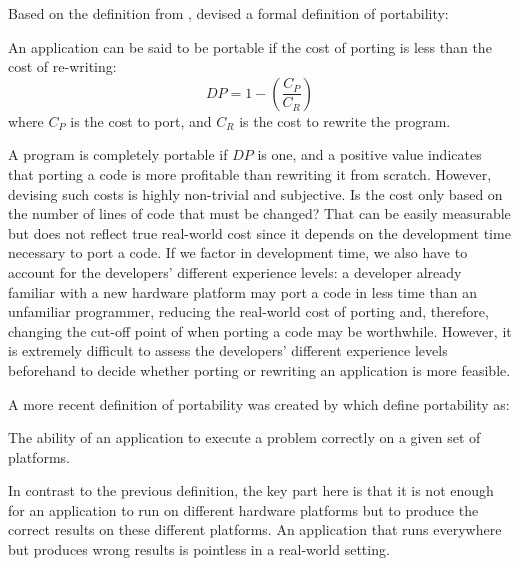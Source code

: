 Based on the definition from \citet{mooney_strategies_1990, mooney_bringing_1997}, \citet{sedova_high-performance_2018} devised a formal definition of portability:
\begin{definition}
An application can be said to be portable if the cost of porting is less than the cost of re-writing:
$$DP = 1 - \left(\frac{C_P}{C_R}\right)$$
where $C_P$ is the cost to port, and $C_R$ is the cost to rewrite the program. 
\end{definition}
A program is completely portable if $DP$ is one, and a positive value indicates that porting a code is more profitable than rewriting it from scratch. 
However, devising such costs is highly non-trivial and subjective. 
Is the cost only based on the number of lines of code that must be changed? 
That can be easily measurable but does not reflect true real-world cost since it depends on the development time necessary to port a code. 
If we factor in development time, we also have to account for the developers' different experience levels: a developer already familiar with a new hardware platform may port a code in less time than an unfamiliar programmer, reducing the real-world cost of porting and, therefore, changing the cut-off point of when porting a code may be worthwhile. 
However, it is extremely difficult to assess the developers' different experience levels beforehand to decide whether porting or rewriting an application is more feasible. 

A more recent definition of portability was created by \citet{pennycook_metric_2016, pennycook_implications_2019} which define portability as: 
\begin{quotebox}{\citet{pennycook_implications_2019}}
    The ability of an application to execute a problem correctly on a given set of platforms.
\end{quotebox}
In contrast to the previous definition, the key part here is that it is not enough for an application to run on different hardware platforms but to produce the correct results on these different platforms. 
An application that runs everywhere but produces wrong results is pointless in a real-world setting. 


